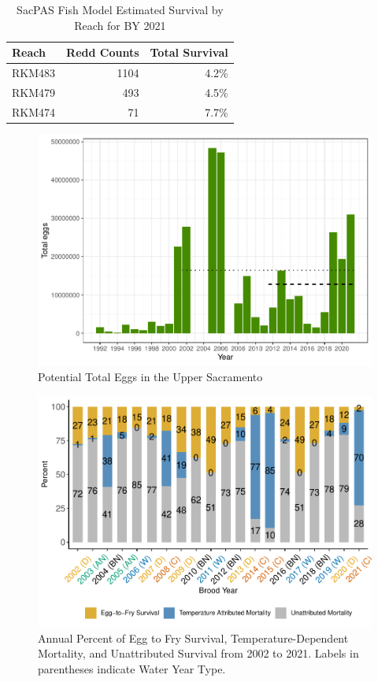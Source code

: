 \documentclass[
]{book}
\theoremstyle{definition}
\theoremstyle{definition}
\theoremstyle{definition}
\theoremstyle{definition}
\theoremstyle{remark}
\begin{document}
\begin{table}
\centering
\caption{SacPAS Fish Model Estimated Survival by Reach for BY  2021}
\centering
\begin{tabular}[t]{lrr}
\hline
Reach & Redd Counts & Total Survival\\
\hline
RKM483 & 1104 & 4.2\%\\
\hline
RKM479 & 493 & 4.5\%\\
\hline
RKM474 & 71 & 7.7\%\\
\hline
\end{tabular}
\end{table}

\begin{figure}
\centering
\includegraphics{_main_files/figure-latex/totaleggs-fig-1.pdf}
\caption{\label{fig:totaleggs-fig}Potential Total Eggs in the Upper Sacramento}
\end{figure}

\begin{figure}
\centering
\includegraphics{_main_files/figure-latex/TDM-etf-fig-1.pdf}
\caption{\label{fig:TDM-etf-fig}Annual Percent of Egg to Fry Survival, Temperature-Dependent Mortality, and Unattributed Survival from 2002 to 2021. Labels in parentheses indicate Water Year Type.}
\end{figure}
\end{document}
